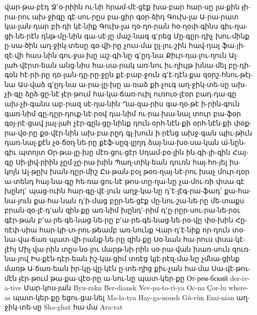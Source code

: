 {    վար-թա-բէդ
    Ջՙօ-րիին
    ու-նի
    հրամ-մէ-ցէք
    խա-բար
    հար-սը
    լա-քին
    յ̵ի-րա-րու
    ախ-ջիգը
    գէ-սու-րըս
    բա-ցիր
    գօր-ձիդ
    Գուխ-լա
    Ա-րա-րատ
    կա-լան-դար
    բի-դի
    կէ-նիք
    Գուխ-լա
    ղօ-ղո-րան
    հօ-ղօփ-գինս
    գիւ-ղա-ցի-նե-րէն
    դնթ-մը-նին
    գա-սէ-յը
    մաշ-նագ
    գՙրեց
    Մը-գըր-դիչ
    խու-մինք
    ը-սա-ծին
    աղ-ջիկ-տեսը
    գօ-վի-րը
    չուս-մա
    ըլ-լու-շին
    հավ-դալ
    ֆա-յի-զէ-վի
    հաս-նին
    գու-ջա-խը
    աշ-գի-նը
    գՙըդ-նա
    Քիւր-դա-լու-ղուն
    Ալ-լահ-վէրտ-եան
    անց-նիս
    հա-սա-րակ
    առ-նու
    իւ-ղիւյթ
    խնա-մել
    բը-դի-գօն
    հէ-րի-րը
    դօ-լան-դը-րը-ջըն
    քէ-բաբ-ջուն
    գՙէ-դէն-քա
    զօրշ-հնու-թէյ-նա
    Աս-վաձ
    գՙըդ-նա
    ա-րա-լը-խը
    ա-ռաձ
    քի-չուգ
    աղ-ջիկ-տե-սը
    ախ-չի-գը
    ձըձ-ցը-նէ
    յ̵էր-թում
    հա-կա-ճառ-ուիլ
    ուռուօ-լէօր
    բադ-դա-գը
    ախ-չի-գանս
    աբ-րազ
    սէ-ղա-նին
    Ղա-զա-րիս
    գա-ղօ-թէ
    ի-րին-գուն
    գառ-նիմ
    գը-դըր-դուք-նէ-րօվ
    դա-նիմ
    ու-րա-խա-նալ
    տուր
    բա-ֆօր
    գօյ-րէ-ցավ
    յալ-լահ
    չէր-գըն-ցը-նինք
    դուն-օրհ-նէն-քի
    օրհ-նէն-քի
    փօք-րա-վօ-րը
    քօ-վէր-նին
    ախ-բա-րըդ
    գլ-խուն
    ի-րէնց
    ախջ-գան
    պիւ-թիւն
    դառ-նալ-քէն
    չօ-ճօղ-նե-րը
    քէֆ-սըզ-լըղդ 
    ձայ-նա-խօ-սա-կան
    ա̈-նըն-գիւ
    պտոյտ
    Օր-թա-լը-խը
    մէռ-ցու-ցէր
    Սդամ-բօ-լին
ին-գի-լի-զին
Հայ-գը
Սի-լիվ-րիին
չըմ-չը-րա-խին
Պաղ-տիկ-եան
դուռն
հայ-հո-յել
իս-կոյն
Ալ-թըխ
խան-դըր-միշ
Ըս-թան-բօլ
թօռ-ղայ-նէ-րու
խաչ
մուր-դօր
ա-տենդ
հայ-նա-գը
հե-ռա-ցու-նէ
թոս-տը-ղա-նը
չա-մու-ռի
փսա-գէ
խընդՙ
պաց-ուին
հար-գը-վէ-լուն
աղջ-կա-նը
դՙէ-լէգ-րա-ֆադՙ
քա-հա-նա-յուն
քա-հա-նան
դՙի-մաց
բըր-նե-ցէք
մը-նու-շա-նե-րը  
մե-տաքս
բրան-զօ-լէ-դՙան
զին-քը
առ-նիմ
խընդՙ-րիմ
դՙը-րըր-սու-րա-նե-րօւ
գէր-թան
բՙա-րե-գե-նաց-նե-րը
բՙա-րե-գե-նաց-նե-րօ-վը
փօ-խին
Հը-ռէփ-սիա
հար-կի-ւո-րու-թեամբ
առ-նունք
Վար-դՙէ-նիք
որ-դուն
տօ-նա-վա-ճառ
պատ-վի-րանք-նե-րը
զին-քը
Սօ-նան
հա-րուս
փսա-կէ-լէհյ
Միլ-վա-րին
տըս-նօ-լու
մարթ-նի-րին
սօ-րա-վան
խառ-սուն
զուռ-նա-յով
Իս-քէն-դէր-եան
իշ-կա-ցիմ
տռէց
կյէ-րէզ-մա-նը
չմնա-ցինք
մառթ
Ա-ճառ-եան
իր-կը-վը-կէն
ը-տե-ղից
քիւ-չան
հա-մա
Սա-վէ-թու-մէն
յ̵էր-թում
թա-քա-վէօ-րը
ա-նու-նը
պատ-կեր-քը
От-рем-бский
der-iv-a-tive
Մար-կոս-յան
Byu-rakn
Ber-diansk
Yev-pa-to-ri-ya
Oc-na
Çor-lu
where-as
պատ-կեր-քը
եցու-ցա-նել
Ma-la-tya
Hay-ga-noush
Gü-rün
Emi-nian
աղ-ջիկ-տե-սը
Sha-ghat
հա-մա
Ara-rat
} 
